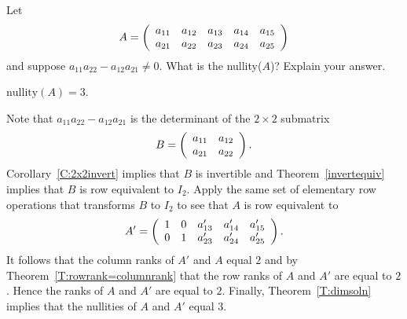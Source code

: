 \documentclass{ximera}
\author{Matthew Carr \& Martin Golubitsky}
\begin{document}

\begin{exercise}\label{mc.exercise15}

Let 
\[
A = \left(\begin{array}{rrrrrrrrrrrrrrrrrr} a_{11} & a_{12} & a_{13} & a_{14} & a_{15} \\ a_{21} & a_{22} & a_{23} & a_{24} & a_{25} \end{array}\right)
\]
and suppose $a_{11}a_{22} - a_{12}a_{21} \neq 0$.  What is the nullity($A$)?  Explain your answer.

  
\begin{solution}

\ans $\mathrm{nullity}(A)=3$.

\soln Note that $a_{11}a_{22} - a_{12}a_{21}$ is the determinant of the $2\times 2$ submatrix  
\[
B=\left(\begin{array}{rrrrrrrrrrrrrrrrrr} a_{11} & a_{12}\\ a_{21} & a_{22} \end{array}\right).
\]
Corollary~\ref{C:2x2invert} implies that $B$ is invertible and  Theorem~\ref{invertequiv} implies that $B$ is row equivalent to $I_2$.  Apply the same set of elementary row operations that transforms $B$ to $I_2$ to see that $A$ is row equivalent to 
\[
A'=\left(\begin{array}{rrrrrrrrrrrrrrrrrr} 1 & 0 & a_{13}' & a_{14}' & a_{15}'\\ 0 & 1 & a_{23}' & a_{24}' & a_{25}' \end{array}\right).
\]
It follows that the column ranks of $A'$ and $A$ equal $2$ and by Theorem~\ref{T:rowrank=columnrank} that the row ranks of $A$ and $A'$ are equal to $2$.  Hence the ranks of $A$ and $A'$ are equal to $2$. Finally,  Theorem~\ref{T:dimsoln} implies that the nullities of $A$ and $A'$ equal 3.  
 
\end{solution}
\end{exercise}
\end{document}
